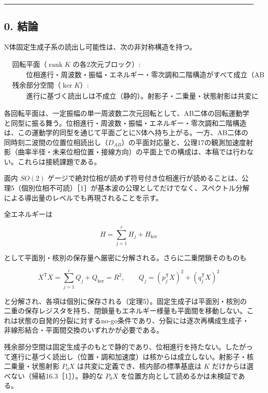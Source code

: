 \documentclass[
  a4paper,
]{ltjsarticle}
\begin{document}
\begin{center}\rule{0.5\linewidth}{0.5pt}\end{center}

\subsection{0. 結論}\label{ux7d50ux8ad6}

N体固定生成子系の読出し可能性は、次の非対称構造を持つ。

\[
\boxed{
\begin{aligned}
&\text{回転平面（}\operatorname{rank}K\text{ の各2次元ブロック）:}\\
&\qquad\text{位相進行・周波数・振幅・エネルギー・零次調和二階構造がすべて成立（AB運動学的同型）}\\
&\text{残余部分空間（}\ker K\text{）:}\\
&\qquad\text{進行に基づく読出しは不成立（静的）。射影子・二乗量・状態射影は共変に定義できる}
\end{aligned}
}
\]

各回転平面は、一定振幅の単一周波数二次元回転として、AB二体の回転運動学と同型に振る舞う。位相進行・周波数・振幅・エネルギー・零次調和二階構造は、この運動学的同型を通じて平面ごとにN体へ持ち上がる。一方、AB二体の同時刻二波間の位置位相読出し（\(D_{AB}\)）の平面対応量と、公理17の観測加速度射影（曲率半径・未来位相位置・接線方向）の平面上での構成は、本稿では行わない。これらは接続課題である。

面内 \(SO(2)\)
ゲージで絶対位相が読めず符号付き位相進行が読めることは、公理5（個別位相不可読）［1］が基本波の公理としてだけでなく、スペクトル分解による導出量のレベルでも再現されることを示す。

全エネルギーは

\[
H=\sum_{j=1}^{r}H_j+H_{\ker}
\]

として平面別・核別の保存量へ厳密に分解される。さらに二乗閉鎖そのものも

\[
X^{\mathsf T}X=\sum_{j=1}^{r}Q_j+Q_{\ker}=R^2,
\qquad
Q_j=(p_j^{\mathsf T}X)^2+(q_j^{\mathsf T}X)^2
\]

と分解され、各項は個別に保存される（定理5）。固定生成子は平面別・核別の二重の保存レジスタを持ち、閉鎖量もエネルギー様量も平面間を移動しない。これは状態の自発的分裂に対するno-go条件であり、分裂には逐次再構成生成子・非線形結合・平面間交換のいずれかが必要である。

残余部分空間は固定生成子のもとで静的であり、位相進行を持たない。したがって進行に基づく読出し（位置・調和加速度）は核からは成立しない。射影子・核二乗量・状態射影
\(P_0X\) は共変に定義でき、核内部の標準基底は \(K\)
だけからは選べない（帰結16.3［1］）。静的な \(P_0X\)
を位置方向として読めるかは未検証である。
\end{document}
